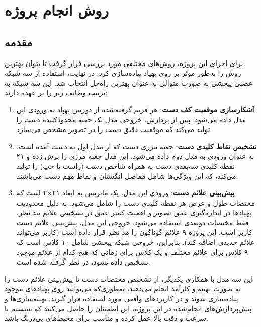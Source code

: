 \chapter{روش انجام پروژه}
\section{مقدمه}
برای اجرای این پروژه، روش‌های مختلفی مورد بررسی قرار گرفت تا بتوان بهترین روش را به‌طور موثر  بر روی پهپاد پیاده‌سازی کرد. در نهایت، استفاده از سه شبکه عصبی پیچشی به صورت متوالی به عنوان بهترین راه‌حل انتخاب شد. این سه شبکه به ترتیب وظایف زیر را بر عهده دارند:

\begin{enumerate}
    \item \textbf{آشکارسازی موقعیت کف دست}: هر فریم گرفته‌شده از دوربین پهپاد به ورودی این مدل داده می‌شود. پس از پردازش، خروجی مدل یک جعبه محدودکننده  دست را تولید می‌کند که موقعیت دقیق دست را در تصویر مشخص می‌سازد.
    
    \item \textbf{تشخیص نقاط کلیدی دست}: جعبه مرزی دست که از مدل اول به دست آمده است، به عنوان ورودی به مدل دوم داده می‌شود. این مدل جعبه مرزی را برش زده و ۲۱ نقطه کلیدی سه‌بعدی دست به همراه شاخص دست (راست یا چپ) را تولید می‌کند، که این ویژگی‌ها شامل مفاصل انگشتان و نقاط مهم دست می‌باشند.
    
    \item \textbf{پیش‌بینی علائم دست}: ورودی این مدل، یک ماتریس به ابعاد ۲۱×۲ است که مختصات طول و عرض هر نقطه کلیدی دست را شامل می‌شود. به دلیل محدودیت پهپادها در اندازه‌گیری عمق تصویر و اهمیت کمتر عمق
     در تشخیص علائم مد نظر، فقط مختصات دوبعدی استفاده می‌شود. خروجی این مدل، پیش‌بینی علائم دست کاربر است. این پروژه ۹ علائم گوناگون را مد نظر قرار داده است (کاربر می‌تواند علائم‌ جدیدی اضافه کند). بنابراین، خروجی شبکه پیچشی شامل ۱۰ کلاس است که ۹ کلاس برای علائم مختلف و یک کلاس برای زمانی که هیچ کدام از علائم موجود تشخیص داده نشود، در نظر گرفته شده است.
\end{enumerate}

این سه مدل با همکاری یکدیگر، از تشخیص  مختصات دست تا پیش‌بینی علائم دست را به صورت بهینه و کارآمد انجام می‌دهند، به‌طوری‌که می‌توانند روی پهپادهای موجود پیاده‌سازی شوند و در کاربردهای واقعی مورد استفاده قرار گیرند. بهینه‌سازی‌ها و پیش‌پردازش‌های انجام‌شده در این پروژه،  این اطمینان را حاصل می‌کنند که سیستم با سرعت و دقت بالا عمل کرده و مناسب برای محیط‌های بی‌درنگ باشد.


